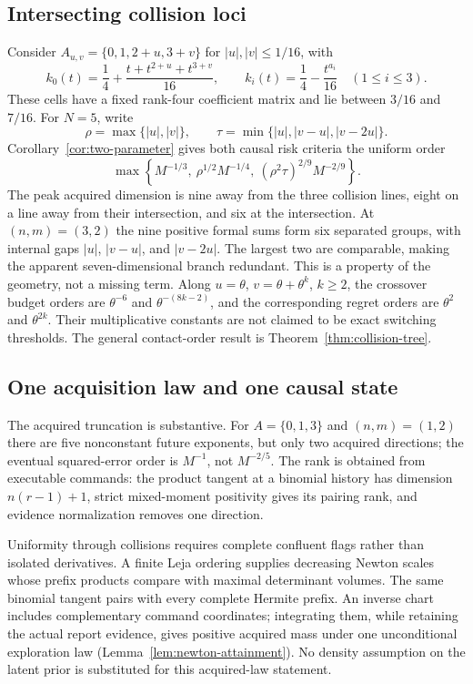 \subsection{Intersecting collision loci}
\label{sec:early-collision-example}
Consider $A_{u,v}=\{0,1,2+u,3+v\}$ for $|u|,|v|\le1/16$, with
\[
 k_0(t)=\frac14+\frac{t+t^{2+u}+t^{3+v}}{16},\qquad
 k_i(t)=\frac14-\frac{t^{a_i}}{16}\quad(1\le i\le3).
\]
These cells have a fixed rank-four coefficient matrix and lie between
$3/16$ and $7/16$. For $N=5$, write
\[
 \rho=\max\{|u|,|v|\},\qquad
 \tau=\min\{|u|,|v-u|,|v-2u|\}.
\]
Corollary~\ref{cor:two-parameter} gives both causal risk criteria the
uniform order
\begin{equation}\label{eq:early-two-parameter-v24}
 \max\left\{M^{-1/3},\ \rho^{1/2}M^{-1/4},\
                    (\rho^2\tau)^{2/9}M^{-2/9}\right\}.
\end{equation}
The peak acquired dimension is nine away from the three collision
lines, eight on a line away from their intersection, and six at the
intersection. At $(n,m)=(3,2)$ the nine positive formal sums form six
separated groups, with internal gaps $|u|$, $|v-u|$, and $|v-2u|$.
The largest two are comparable, making the apparent seven-dimensional
branch redundant. This is a property of the geometry, not a missing
term. Along $u=\theta$, $v=\theta+\theta^k$, $k\ge2$, the crossover
budget orders are $\theta^{-6}$ and $\theta^{-(8k-2)}$, and the
corresponding regret orders are $\theta^2$ and $\theta^{2k}$.
Their multiplicative constants are not claimed to be exact switching
thresholds. The general contact-order result is
Theorem~\ref{thm:collision-tree}.

\subsection{One acquisition law and one causal state}
\label{sec:contribution-v23}\label{sec:proof-route-v24}
The acquired truncation is substantive. For $A=\{0,1,3\}$ and
$(n,m)=(1,2)$ there are five nonconstant future exponents, but only
two acquired directions; the eventual squared-error order is $M^{-1}$,
not $M^{-2/5}$. The rank is obtained from executable commands: the
product tangent at a binomial history has dimension $n(r-1)+1$,
strict mixed-moment positivity gives its pairing rank, and evidence
normalization removes one direction.

Uniformity through collisions requires complete confluent flags rather
than isolated derivatives. A finite Leja ordering supplies decreasing
Newton scales whose prefix products compare with maximal determinant
volumes. The same binomial tangent pairs with every complete Hermite
prefix. An inverse chart includes complementary command coordinates;
integrating them, while retaining the actual report evidence, gives
positive acquired mass under one unconditional exploration law
(Lemma~\ref{lem:newton-attainment}). No density assumption on the
latent prior is substituted for this acquired-law statement.

